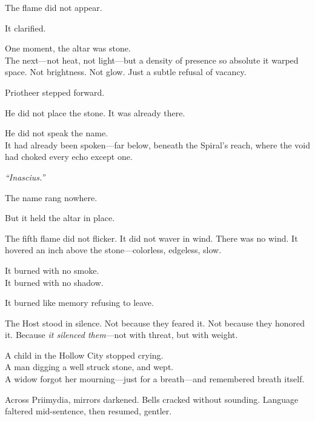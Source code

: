\documentclass[12pt]{article}
\begin{document}
The flame did not appear.

\vspace{0.5em}
It clarified.

\vspace{0.5em}
One moment, the altar was stone.\\
The next---not heat, not light---but a density of presence so absolute it warped space. Not brightness. Not glow. Just a subtle refusal of vacancy.

\vspace{0.5em}
Priotheer stepped forward.

\vspace{0.5em}
He did not place the stone. It was already there.

\vspace{0.5em}
He did not speak the name.\\
It had already been spoken---far below, beneath the Spiral’s reach, where the void had choked every echo except one.

\vspace{0.5em}
\textit{``Inascius.''}

\vspace{0.5em}
The name rang nowhere.

\vspace{0.5em}
But it held the altar in place.

\vspace{0.5em}
The fifth flame did not flicker. It did not waver in wind. There was no wind. It hovered an inch above the stone---colorless, edgeless, slow.

\vspace{0.5em}
It burned with no smoke.\\
It burned with no shadow.

\vspace{0.5em}
It burned like memory refusing to leave.

\vspace{0.5em}
The Host stood in silence. Not because they feared it. Not because they honored it. Because \textit{it silenced them}---not with threat, but with weight.

\vspace{0.5em}
A child in the Hollow City stopped crying.\\
A man digging a well struck stone, and wept.\\
A widow forgot her mourning---just for a breath---and remembered breath itself.

\vspace{0.5em}
Across Priimydia, mirrors darkened. Bells cracked without sounding. Language faltered mid-sentence, then resumed, gentler.
\end{document}
